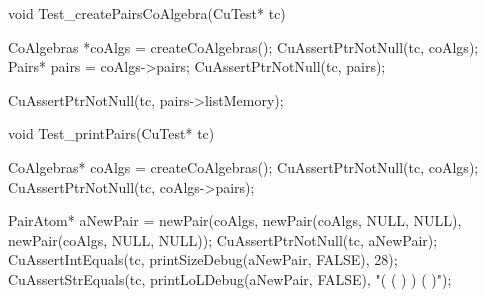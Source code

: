 void Test_createPairsCoAlgebra(CuTest* tc) {
  CoAlgebras *coAlgs = createCoAlgebras();
  CuAssertPtrNotNull(tc, coAlgs);
  Pairs* pairs = coAlgs->pairs;
  CuAssertPtrNotNull(tc, pairs);

  CuAssertPtrNotNull(tc, pairs->listMemory);
}

void Test_printPairs(CuTest* tc) {
  CoAlgebras* coAlgs = createCoAlgebras();
  CuAssertPtrNotNull(tc, coAlgs);
  CuAssertPtrNotNull(tc, coAlgs->pairs);

  PairAtom* aNewPair = newPair(coAlgs,
                               newPair(coAlgs, NULL, NULL),
                               newPair(coAlgs, NULL, NULL));
  CuAssertPtrNotNull(tc, aNewPair);
  CuAssertIntEquals(tc, printSizeDebug(aNewPair, FALSE), 28);
  CuAssertStrEquals(tc, printLoLDebug(aNewPair, FALSE), "( ( ) ) ( )");
}
\stoptyping

